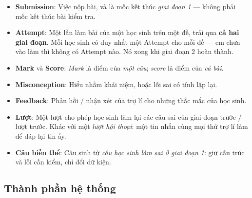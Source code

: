 \begin{itemize}
        gian của một \emph{Publication}. Hai mốc đầu là thời điểm mở và đóng giai đoạn 1; mốc thứ ba là thời điểm đóng giai đoạn 2. 
  \item \textbf{Submission}: Việc nộp bài, và là mốc kết thúc \emph{giai đoạn 1} --- không phải
        mốc kết thúc bài kiểm tra.
  \item \textbf{Attempt}: Một lần làm bài của một học sinh trên một đề, trải qua \textbf{cả hai giai
        đoạn}. Mỗi học sinh có duy nhất một Attempt cho mỗi đề --- em chưa vào làm thì
        không có Attempt nào. Nó xong khi giai đoạn 2 hoàn thành.
  \item \textbf{Mark} và \textbf{Score}: \emph{Mark} là điểm của \emph{một câu}; \emph{score} là điểm
        của \emph{cả bài}. 
  \item \textbf{Misconception}: Hiểu nhầm khái niệm, hoặc lỗi sai có tính lặp lại.
  \item \textbf{Feedback}: Phản hồi / nhận xét của trợ lí cho những thắc mắc của học sinh.
  \item \textbf{Lượt}: Một lượt cho phép học sinh làm lại các câu sai của giai đoạn trước / lượt trước.
        Khác với một \emph{lượt hội thoại}: một tin nhắn cùng mọi thứ trợ lí làm để đáp lại tin ấy.
  \item \textbf{Câu biến thể}: Câu sinh từ \emph{câu học sinh làm sai ở giai đoạn 1}: giữ cấu trúc và lỗi cần
        kiểm, chỉ đổi dữ kiện.
\end{itemize}

\subsection{Thành phần hệ thống}

